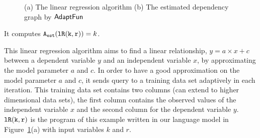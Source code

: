 \begin{example}
\begin{figure}
\begin{subfigure}{.55\textwidth}
\begin{centering}
         \caption{}
            \end{centering}
            \end{subfigure}
    \caption{(a) The linear regression algorithm 
    (b) The estimated dependency graph by $\textsf{AdaptFun}$}
    \label{fig:linear_regression}
\end{figure}
%
It computes $ {\mathtt{A_{est}}}(\mathtt{lR(k, r)}) = k$.
\end{example} 
%
This linear regression algorithm 
aims to
find a linear relationship, $y = a \times x + c$ between a dependent variable $y$
and an independent variable $x$, by approximating the 
model parameter $a$ and $c$.
In order to have a good approximation on the model parameter 
$a$ and $c$, 
it sends query to a training data set adaptively in each iteration.
This training data set contains two columns (can extend to higher dimensional data sets), 
the first column contains the observed values of the independent variable $x$ and the
second column for the dependent variable $y$.
$\mathtt{lR(k, r)}$ is the program of this example written in our language model in Figure~\ref{fig:linear_regression}(a)
with input variables $k$ and $r$.

